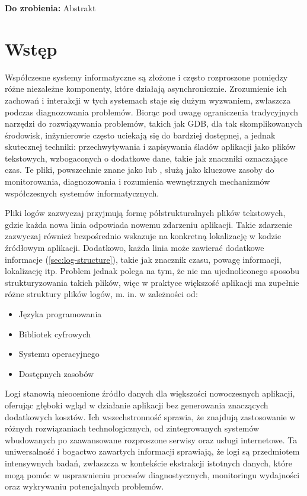 \documentclass{pginz}
\newcommand{\todo}[1]{\textbf{Do zrobienia: } #1}
\newcommand{\mref}[1]{(\ref{#1})}
\begin{document}

% 
\setcounter{page}{3}

\todo{Abstrakt}

\tableofcontents
{}

\newpage

\chapter{Wstęp}

Współczesne systemy informatyczne są złożone i często rozproszone pomiędzy różne niezależne komponenty, które działają asynchronicznie.
Zrozumienie ich zachowań i interakcji w tych systemach staje się dużym wyzwaniem, zwłaszcza podczas diagnozowania problemów.
Biorąc pod uwagę ograniczenia tradycyjnych narzędzi do rozwiązywania problemów, takich jak GDB, dla tak skomplikowanych środowisk,
inżynierowie często uciekają się do bardziej dostępnej, a jednak skutecznej techniki:
przechwytywania i zapisywania śladów aplikacji jako plików tekstowych, wzbogaconych o dodatkowe dane, takie jak znaczniki oznaczające czas.
Te pliki, powszechnie znane jako  lub , służą jako kluczowe zasoby do monitorowania, diagnozowania i rozumienia wewnętrznych mechanizmów współczesnych systemów informatycznych.

Pliki logów zazwyczaj przyjmują formę półstrukturalnych plików tekstowych, gdzie
każda nowa linia odpowiada nowemu zdarzeniu aplikacji.
Takie zdarzenie zazwyczaj również bezpośrednio wskazuje na konkretną lokalizację
w kodzie źródłowym aplikacji.
Dodatkowo, każda linia może zawierać dodatkowe informacje \mref{sec:log-structure}, takie jak znacznik
czasu, powagę informacji, lokalizację itp.
Problem jednak polega na tym, że nie ma ujednoliconego sposobu strukturyzowania
takich plików, więc w praktyce większość aplikacji ma zupełnie różne struktury
plików logów\cite{LogTypes}, m. in. w zależności od:

\begin{itemize}
  \item Języka programowania
  \item Bibliotek cyfrowych
  \item Systemu operacyjnego
  \item Dostępnych zasobów
\end{itemize}

Logi stanowią nieocenione źródło danych dla
większości nowoczesnych aplikacji, oferując głęboki wgląd w działanie aplikacji
bez generowania znaczących dodatkowych kosztów.
Ich wszechstronność sprawia, że znajdują zastosowanie w różnych rozwiązaniach
technologicznych, od zintegrowanych systemów wbudowanych po zaawansowane
rozproszone serwisy oraz usługi internetowe.
Ta uniwersalność i bogactwo zawartych informacji sprawiają, że logi są
przedmiotem intensywnych badań, zwłaszcza w kontekście ekstrakcji istotnych
danych, które mogą pomóc w usprawnieniu procesów diagnostycznych, monitoringu
wydajności oraz wykrywaniu potencjalnych problemów.
\end{document}
